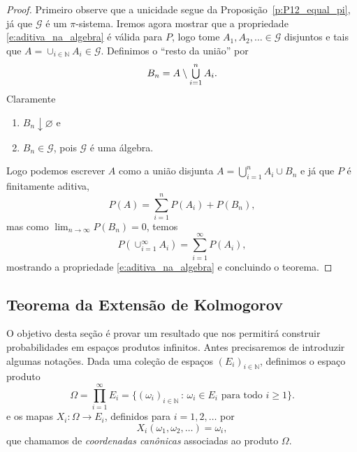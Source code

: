 \begin{proof}
  Primeiro observe que a unicidade segue da Proposição~\ref{p:P12_equal_pi}, já que $\mathcal{G}$ é um $\pi$-sistema.
  Iremos agora mostrar que a propriedade \eqref{e:aditiva_na_algebra} é válida para $P$, logo tome $A_1, A_2, \dots \in \mathcal{G}$ disjuntos e tais que $A = \cup_{i\in \mathbb{N}} A_i \in \mathcal{G}$.
  Definimos o ``resto da união'' por
  \begin{equation}
    B_n = A \setminus \operatorname*{{\textstyle \bigcup}}_{i=1}^n A_i.
  \end{equation}
  Claramente
  \begin{enumerate}[\quad a)]
  \item $B_n \downarrow \varnothing$ e
  \item $B_n \in \mathcal{G}$, pois $\mathcal{G}$ é uma álgebra.
  \end{enumerate}

  Logo podemos escrever $A$ como a união disjunta $A = \bigcup_{i=1}^n A_i \cup B_n$ e já que $P$ é finitamente aditiva,
  \begin{equation}
    P(A) = \sum_{i=1}^n P(A_i) + P(B_n),
  \end{equation}
  mas como $\lim_{n\to \infty} P(B_n) = 0$, temos
  \begin{equation}
    P(\cup_{i=1}^{\infty} A_i) = \sum_{i=1}^{\infty} P(A_i),
  \end{equation}
  mostrando a propriedade \eqref{e:aditiva_na_algebra} e concluindo o teorema.
\end{proof}

\subsection{Teorema da Extensão de Kolmogorov}

O objetivo desta seção é provar um resultado que nos permitirá construir probabilidades em espaços produtos infinitos.
Antes precisaremos de introduzir algumas notações.
Dada uma coleção de espaços $(E_i)_{i\in \mathbb{N}}$, definimos o espaço produto
\begin{equation}
  \Omega = \prod_{i=1}^{\infty} E_i = \big\{(\omega_i)_{i\in \mathbb{N}} \, : \,  \omega_i \in E_i \text{ para todo $i \geq 1$}\big\}.
\end{equation}
e os mapas $X_i:\Omega \to E_i$, definidos para $i = 1, 2, \dots$ por
\begin{equation}
  X_i(\omega_1, \omega_2, \dots) = \omega_i,
\end{equation}
que chamamos de \emph{coordenadas canônicas}  associadas ao produto $\Omega$.

